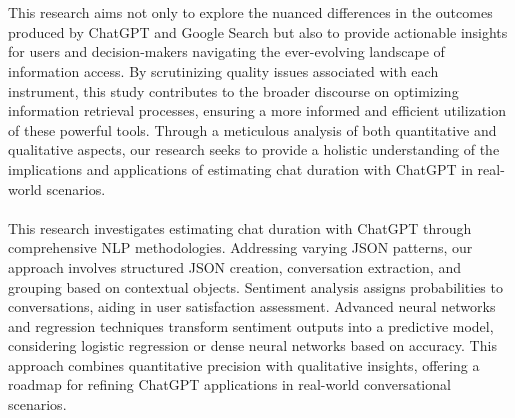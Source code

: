 \documentclass[journal]{IEEEtran}
\begin{document}
\\ \\
This research aims not only to explore the nuanced differences in the outcomes produced by ChatGPT and Google Search but also to provide actionable insights for users and decision-makers navigating the ever-evolving landscape of information access. By scrutinizing quality issues associated with each instrument, this study contributes to the broader discourse on optimizing information retrieval processes, ensuring a more informed and efficient utilization of these powerful tools. Through a meticulous analysis of both quantitative and qualitative aspects, our research seeks to provide a holistic understanding of the implications and applications of estimating chat duration with ChatGPT in real-world scenarios. \\ \\
This research investigates estimating chat duration with ChatGPT through comprehensive NLP methodologies. Addressing varying JSON patterns, our approach involves structured JSON creation, conversation extraction, and grouping based on contextual objects. Sentiment analysis assigns probabilities to conversations, aiding in user satisfaction assessment. Advanced neural networks and regression techniques transform sentiment outputs into a predictive model, considering logistic regression or dense neural networks based on accuracy. This approach combines quantitative precision with qualitative insights, offering a roadmap for refining ChatGPT applications in real-world conversational scenarios.
\end{document}
